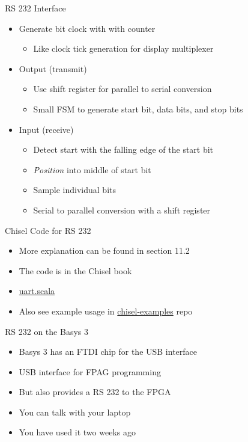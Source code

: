 \begin{frame}[fragile]{RS 232 Interface}
\begin{itemize}
\item Generate bit clock with with counter
\begin{itemize}
\item Like clock tick generation for display multiplexer
\end{itemize}
\item Output (transmit)
\begin{itemize}
\item Use shift register for parallel to serial conversion
\item Small FSM to generate start bit, data bits, and stop bits
\end{itemize}
\item Input (receive)
\begin{itemize}
\item Detect start with the falling edge of the start bit
\item \emph{Position} into middle of start bit
\item Sample individual bits
\item Serial to parallel conversion with a shift register
\end{itemize}
\end{itemize}
\end{frame}


\begin{frame}[fragile]{Chisel Code for RS 232}
\begin{itemize}
\item More explanation can be found in section 11.2
\item The code is in the Chisel book
\item \href{https://github.com/schoeberl/chisel-book/blob/master/src/main/scala/uart/uart.scala}{uart.scala}
\item Also see example usage in \href{https://github.com/schoeberl/chisel-examples}{chisel-examples} repo
\end{itemize}
\end{frame}

\begin{frame}[fragile]{RS 232 on the Basys 3}
\begin{itemize}
\item Basys 3 has an FTDI chip for the USB interface
\item USB interface for FPAG programming
\item But also provides a RS 232 to the FPGA
\item You can talk with your laptop
\item You have used it two weeks ago
\end{itemize}
\end{frame}



